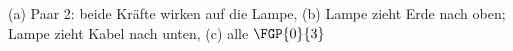 (a) Paar 2: beide Kräfte wirken auf die Lampe, (b) Lampe zieht Erde nach oben; Lampe zieht Kabel nach unten, (c) alle $\FGP{0}{3}$
